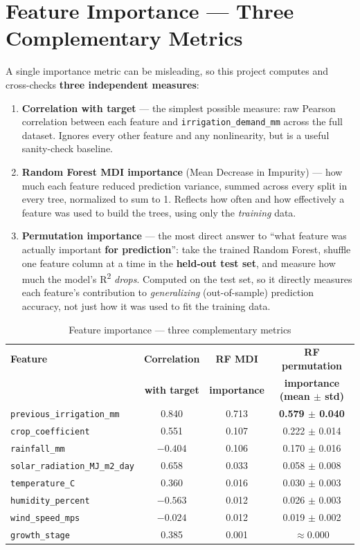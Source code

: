 \documentclass[11pt,a4paper]{article}
\begin{document}
\section{Feature Importance --- Three Complementary Metrics}

A single importance metric can be misleading, so this project computes and
cross-checks \textbf{three independent measures}:

\begin{enumerate}[label=\arabic*.,leftmargin=2em]
    \item \textbf{Correlation with target} --- the simplest possible measure:
    raw Pearson correlation between each feature and
    \texttt{irrigation\_demand\_mm} across the full dataset. Ignores every
    other feature and any nonlinearity, but is a useful sanity-check baseline.
    \item \textbf{Random Forest MDI importance} (Mean Decrease in Impurity)
    --- how much each feature reduced prediction variance, summed across
    every split in every tree, normalized to sum to 1. Reflects how often and
    how effectively a feature was used to build the trees, using only the
    \emph{training} data.
    \item \textbf{Permutation importance} --- the most direct answer to
    ``what feature was actually important \textbf{for prediction}'': take the
    trained Random Forest, shuffle one feature column at a time in the
    \textbf{held-out test set}, and measure how much the model's
    R\textsuperscript{2} \emph{drops}. Computed on the test set, so it
    directly measures each feature's contribution to \emph{generalizing}
    (out-of-sample) prediction accuracy, not just how it was used to fit the
    training data.
\end{enumerate}

\begin{table}[H]
\centering
\caption{Feature importance --- three complementary metrics}
\label{tab:importance}
\begin{tabular}{@{}lccc@{}}
\toprule
\textbf{Feature} & \textbf{Correlation} & \textbf{RF MDI} & \textbf{RF permutation} \\
& \textbf{with target} & \textbf{importance} & \textbf{importance (mean $\pm$ std)} \\
\midrule
\texttt{previous\_irrigation\_mm} & 0.840 & 0.713 & \textbf{0.579 $\pm$ 0.040} \\
\texttt{crop\_coefficient} & 0.551 & 0.107 & 0.222 $\pm$ 0.014 \\
\texttt{rainfall\_mm} & $-0.404$ & 0.106 & 0.170 $\pm$ 0.016 \\
\texttt{solar\_radiation\_MJ\_m2\_day} & 0.658 & 0.033 & 0.058 $\pm$ 0.008 \\
\texttt{temperature\_C} & 0.360 & 0.016 & 0.030 $\pm$ 0.003 \\
\texttt{humidity\_percent} & $-0.563$ & 0.012 & 0.026 $\pm$ 0.003 \\
\texttt{wind\_speed\_mps} & $-0.024$ & 0.012 & 0.019 $\pm$ 0.002 \\
\texttt{growth\_stage} & 0.385 & 0.001 & $\approx$0.000 \\
\bottomrule
\end{tabular}
\end{table}
\end{document}
